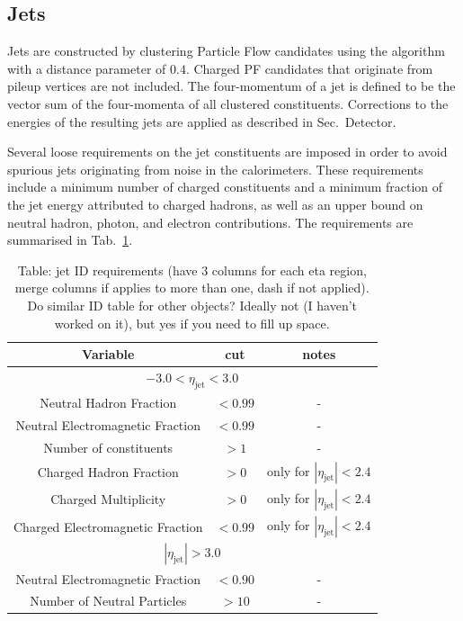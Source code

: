 

\subsection*{Jets}

Jets are constructed by clustering Particle Flow candidates using the \antikt 
algorithm with a distance parameter of $0.4$. Charged PF candidates that 
originate from pileup vertices are not included. The four-momentum of a jet is 
defined to be the vector sum of the four-momenta of all clustered constituents. 
Corrections to the energies of the resulting jets are applied as described in 
Sec.~Detector.

Several loose requirements on the jet constituents are imposed in order to 
avoid spurious jets originating from noise in the calorimeters. These 
requirements include a minimum number of charged constituents and a minimum 
fraction of the jet energy attributed to charged hadrons, as well as an upper 
bound on neutral hadron, photon, and electron contributions. The requirements 
are summarised in Tab.~\ref{tab:jet-id}.


\begin{table}[ht!]
\caption{Table: jet ID requirements (have 3 columns for each eta region, merge 
columns if applies to more than one, dash if not applied).
Do similar ID table for other objects? Ideally not (I haven't worked on it), 
but yes if you need to fill up space.}
\label{tab:jet-id}
\centering
\begin{tabular}{ ccc }
Variable & cut & notes \\ \hline
\multicolumn{3}{c}{$-3.0 < \eta_{\mathrm{jet}} < 3.0$} \\ \hline    
Neutral Hadron Fraction & $<0.99$ & - \\
Neutral Electromagnetic Fraction & $<0.99$ & - \\
Number of constituents & $>1$ & - \\
Charged Hadron Fraction & $>0$ & only for $|\eta_{\mathrm{jet}}| < 2.4$ \\
Charged Multiplicity & $>0$ & only for $|\eta_{\mathrm{jet}}| < 2.4$ \\
Charged Electromagnetic Fraction & $<0.99$ & only for $|\eta_{\mathrm{jet}}| < 
2.4$ \\ \hline
\multicolumn{3}{c}{$|\eta_{\mathrm{jet}}| > 3.0$} \\ \hline        
Neutral Electromagnetic Fraction & $<0.90$ & - \\
Number of Neutral Particles & $>10$ & - \\
\end{tabular}
\end{table}

